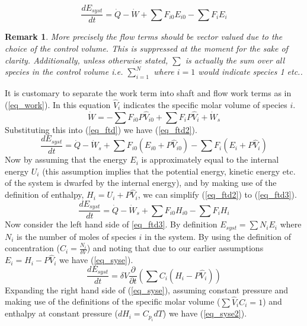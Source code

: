 \documentclass[11pt,fleqn]{article}
\theoremstyle{defstyle}
\newtheorem{rmrk}{Remark}[section]
\begin{document}
\begin{equation}
\frac{d E_{syst}}{dt} = \dot{Q} - \dot{W} + \sum F_{i0}E_{i0} -\sum F_{i}E_{i}
\label{eq_ftd}
\end{equation}
\begin{rmrk}
More precisely the flow terms should be vector valued due to the choice of the control volume. This is suppressed at the moment for the sake of clarity. Additionally, unless otherwise stated, $\sum$ is actually the sum over all species in the control volume i.e. $\sum_{i=1}^{N}$ where $i=1$ would indicate species 1 etc.. 
\end{rmrk}
It is customary to separate the work term into shaft and flow work terms as in (\ref{eq_work}). In this equation $\hat{V}_i$ indicates the specific molar volume of species $i$.
\begin{equation}
\dot{W} = -\sum F_{i0}P\hat{V}_{i0} + \sum F_{i}P\hat{V}_{i} + \dot{W}_s
\label{eq_work} 
\end{equation}
Substituting this into (\ref{eq_ftd}) we have (\ref{eq_ftd2}).
\begin{equation}
\frac{d E_{syst}}{dt} = \dot{Q} - \dot{W}_s + \sum F_{i0}(E_{i0}+P\hat{V}_{i0}) -\sum F_{i}(E_{i}+P\hat{V}_{i})
\label{eq_ftd2}
\end{equation}
Now by assuming that the energy $E_i$ is approximately equal to the internal energy $U_i$ (this assumption implies that the potential energy, kinetic energy etc. of the system is dwarfed by the internal energy), and by making use of the definition of enthalpy, $H_i = U_i + P\hat{V}_i$, we can simplify (\ref{eq_ftd2}) to (\ref{eq_ftd3}).
\begin{equation}
\frac{d E_{syst}}{dt} = \dot{Q} - \dot{W}_s + \sum F_{i0}H_{i0} -\sum F_{i}H_{i}
\label{eq_ftd3}
\end{equation} 
Now consider the left hand side of \ref{eq_ftd3}. By definition $E_{syst} = \sum N_iE_i$ where $N_i$ is the number of moles of species $i$ in the system. By using the definition of concentration ($C_i = \frac{N_i}{\delta V}$) and noting that due to our earlier assumptions $E_i = H_i - P\hat{V}_i$  we have (\ref{eq_syse}).
\begin{equation}
\frac{d E_{syst}}{dt} = \delta V \frac{\partial}{\partial t}\left(\sum C_i (H_i - P\hat{V}_i)\right)
\label{eq_syse}
\end{equation}
Expanding the right hand side of (\ref{eq_syse}), assuming constant pressure and making use of the definitions of the specific molar volume ($\sum \hat{V}_iC_i = 1$) and enthalpy at constant pressure ($dH_i = C_{p_i}dT$) we have (\ref{eq_syse2}).
\end{document}
